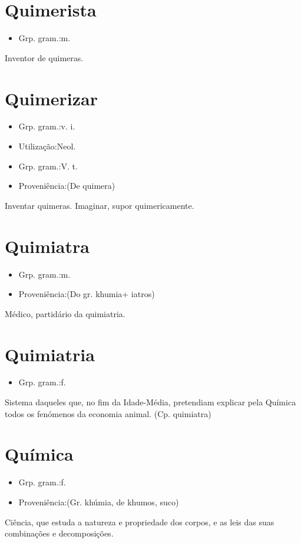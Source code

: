 \section{Quimerista}
\begin{itemize}
\item {Grp. gram.:m.}
\end{itemize}
Inventor de quimeras.
\section{Quimerizar}
\begin{itemize}
\item {Grp. gram.:v. i.}
\end{itemize}
\begin{itemize}
\item {Utilização:Neol.}
\end{itemize}
\begin{itemize}
\item {Grp. gram.:V. t.}
\end{itemize}
\begin{itemize}
\item {Proveniência:(De \textunderscore quimera\textunderscore )}
\end{itemize}
Inventar quimeras.
Imaginar, supor quimericamente.
\section{Quimiatra}
\begin{itemize}
\item {Grp. gram.:m.}
\end{itemize}
\begin{itemize}
\item {Proveniência:(Do gr. \textunderscore khumia\textunderscore  + \textunderscore iatros\textunderscore )}
\end{itemize}
Médico, partidário da quimiatria.
\section{Quimiatria}
\begin{itemize}
\item {Grp. gram.:f.}
\end{itemize}
Sistema daqueles que, no fim da Idade-Média, pretendiam explicar pela Química todos os fenómenos da economia animal.
(Cp. \textunderscore quimiatra\textunderscore )
\section{Química}
\begin{itemize}
\item {Grp. gram.:f.}
\end{itemize}
\begin{itemize}
\item {Proveniência:(Gr. \textunderscore khúmia\textunderscore , de \textunderscore khumos\textunderscore , suco)}
\end{itemize}
Ciência, que estuda a natureza e propriedade dos corpos, e as leis das suas combinações e decomposições.
